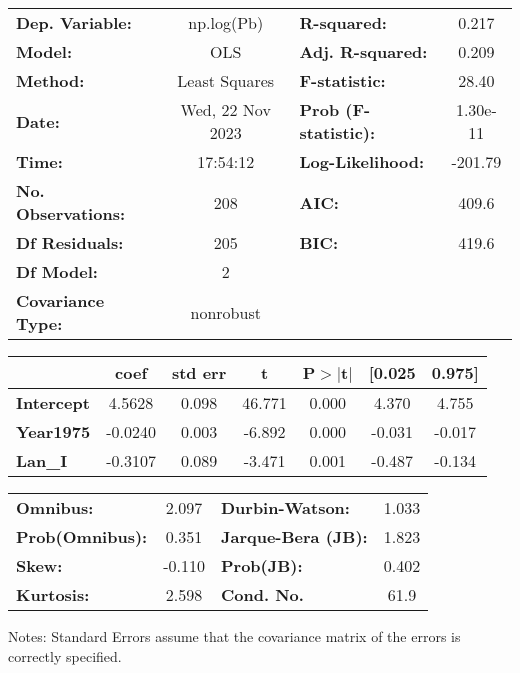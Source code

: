 \begin{center}
\begin{tabular}{lclc}
\toprule
\textbf{Dep. Variable:}    &    np.log(Pb)    & \textbf{  R-squared:         } &     0.217   \\
\textbf{Model:}            &       OLS        & \textbf{  Adj. R-squared:    } &     0.209   \\
\textbf{Method:}           &  Least Squares   & \textbf{  F-statistic:       } &     28.40   \\
\textbf{Date:}             & Wed, 22 Nov 2023 & \textbf{  Prob (F-statistic):} &  1.30e-11   \\
\textbf{Time:}             &     17:54:12     & \textbf{  Log-Likelihood:    } &   -201.79   \\
\textbf{No. Observations:} &         208      & \textbf{  AIC:               } &     409.6   \\
\textbf{Df Residuals:}     &         205      & \textbf{  BIC:               } &     419.6   \\
\textbf{Df Model:}         &           2      & \textbf{                     } &             \\
\textbf{Covariance Type:}  &    nonrobust     & \textbf{                     } &             \\
\bottomrule
\end{tabular}
\begin{tabular}{lcccccc}
                   & \textbf{coef} & \textbf{std err} & \textbf{t} & \textbf{P$> |$t$|$} & \textbf{[0.025} & \textbf{0.975]}  \\
\midrule
\textbf{Intercept} &       4.5628  &        0.098     &    46.771  &         0.000        &        4.370    &        4.755     \\
\textbf{Year1975}  &      -0.0240  &        0.003     &    -6.892  &         0.000        &       -0.031    &       -0.017     \\
\textbf{Lan\_I}    &      -0.3107  &        0.089     &    -3.471  &         0.001        &       -0.487    &       -0.134     \\
\bottomrule
\end{tabular}
\begin{tabular}{lclc}
\textbf{Omnibus:}       &  2.097 & \textbf{  Durbin-Watson:     } &    1.033  \\
\textbf{Prob(Omnibus):} &  0.351 & \textbf{  Jarque-Bera (JB):  } &    1.823  \\
\textbf{Skew:}          & -0.110 & \textbf{  Prob(JB):          } &    0.402  \\
\textbf{Kurtosis:}      &  2.598 & \textbf{  Cond. No.          } &     61.9  \\
\bottomrule
\end{tabular}
\end{center}

Notes: \newline
 [1] Standard Errors assume that the covariance matrix of the errors is correctly specified.